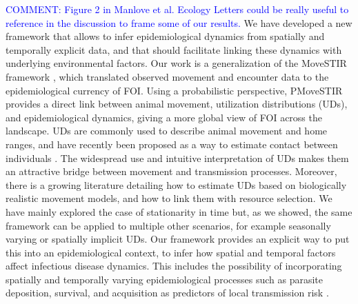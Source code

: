 \documentclass[letterpaper]{article}
\begin{document}
\textcolor{blue}{COMMENT: Figure 2 in Manlove et al. Ecology Letters could be really useful to reference in the discussion to frame some of our results.}
We have developed a new framework that allows to infer epidemiological dynamics from spatially and temporally explicit data, and that should facilitate linking these dynamics with underlying environmental factors. Our work is a generalization of the MoveSTIR framework \citep{Wilber2022}, which translated observed movement and encounter data to the epidemiological currency of FOI. Using a probabilistic perspective, PMoveSTIR provides a direct link between animal movement, utilization distributions (UDs), and epidemiological dynamics, giving a more global view of FOI across the landscape. 
UDs are commonly used to describe animal movement and home ranges, and have recently been proposed as a way to estimate contact between individuals \citep{Noonan2021}. The widespread use and intuitive interpretation of UDs makes them an attractive bridge between movement and transmission processes. Moreover, there is a growing literature detailing how to estimate UDs based on biologically realistic movement models, and how to link them with resource selection. We have mainly explored the case of stationarity in time but, as we showed, the same framework can be applied to multiple other scenarios, for example seasonally varying or spatially implicit UDs. Our framework provides an explicit way to put this into an epidemiological context, to infer how spatial and temporal factors affect infectious disease dynamics. This includes the possibility of incorporating spatially and temporally varying epidemiological processes such as parasite deposition, survival, and acquisition as predictors of local transmission risk \citep{Merkle2018,VanderWaal2017}.
\end{document}
